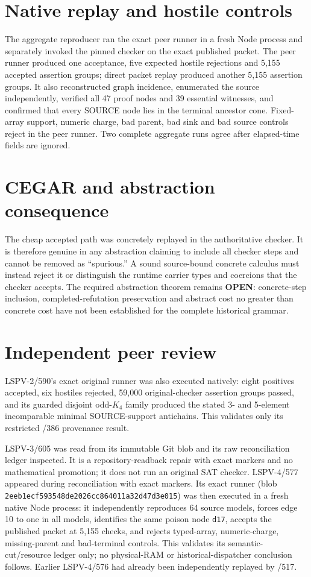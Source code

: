\documentclass[11pt]{article}
\newcommand{\status}[1]{\textbf{#1}}
\begin{document}
\section*{Native replay and hostile controls}
The aggregate reproducer ran the exact peer runner in a fresh Node process and separately invoked the pinned checker on the exact published packet.  The peer runner produced one acceptance, five expected hostile rejections and 5,155 accepted assertion groups; direct packet replay produced another 5,155 assertion groups.  It also reconstructed graph incidence, enumerated the source independently, verified all 47 proof nodes and 39 essential witnesses, and confirmed that every SOURCE node lies in the terminal ancestor cone.  Fixed-array support, numeric charge, bad parent, bad sink and bad source controls reject in the peer runner.  Two complete aggregate runs agree after elapsed-time fields are ignored.

\section*{CEGAR and abstraction consequence}
The cheap accepted path was concretely replayed in the authoritative checker.  It is therefore genuine in any abstraction claiming to include all checker steps and cannot be removed as ``spurious.''  A sound source-bound concrete calculus must instead reject it or distinguish the runtime carrier types and coercions that the checker accepts.  The required abstraction theorem remains \status{OPEN}: concrete-step inclusion, completed-refutation preservation and abstract cost no greater than concrete cost have not been established for the complete historical grammar.

\section*{Independent peer review}
LSPV-2/590's exact original runner was also executed natively: eight positives accepted, six hostiles rejected, 59,000 original-checker assertion groups passed, and its guarded disjoint odd-\(K_4\) family produced the stated 3- and 5-element incomparable minimal SOURCE-support antichains.  This validates only its restricted /386 provenance result.

LSPV-3/605 was read from its immutable Git blob and its raw reconciliation ledger inspected.  It is a repository-readback repair with exact markers and no mathematical promotion; it does not run an original SAT checker.  LSPV-4/577 appeared during reconciliation with exact markers.  Its exact runner (blob \texttt{2eeb1ecf593548de2026cc864011a32d47d3e015}) was then executed in a fresh native Node process: it independently reproduces 64 source models, forces edge 10 to one in all models, identifies the same poison node \texttt{d17}, accepts the published packet at 5,155 checks, and rejects typed-array, numeric-charge, missing-parent and bad-terminal controls.  This validates its semantic-cut/resource ledger only; no physical-RAM or historical-dispatcher conclusion follows.  Earlier LSPV-4/576 had already been independently replayed by /517.
\end{document}
